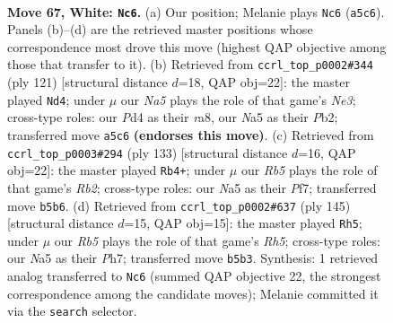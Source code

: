 \documentclass[11pt]{article}
\begin{document}
\clearpage

\begin{figure}[p]\centering
\begin{subfigure}{0.46\textwidth}\centering
\resizebox{\linewidth}{!}{%
\newchessgame
\chessboard[
  setfen={8/6p1/5p1k/NR5p/3P3P/6PK/r7/8 w - - 27 67},
  showmover=false,
  pgfstyle=straightmove, color=movearrow, markmove={a5-c6}
]}
\caption{}
\end{subfigure}\hfill
\begin{subfigure}{0.46\textwidth}\centering
\resizebox{\linewidth}{!}{%
\newchessgame
\chessboard[
  setfen={R7/8/1R2n1p1/5k1p/7P/6PK/1pr5/8 b - - 9 61},
  showmover=false,
  pgfstyle=straightmove, color=movearrow, markmove={e6-d4}
]}
\caption{}
\end{subfigure}
\\[4pt]
\begin{subfigure}{0.46\textwidth}\centering
\resizebox{\linewidth}{!}{%
\newchessgame
\chessboard[
  setfen={5R2/1r3p2/4pPk1/4P2p/5K2/6P1/8/8 b - - 13 67},
  showmover=false,
  pgfstyle=straightmove, color=movearrow, markmove={b7-b4}
]}
\caption{}
\end{subfigure}\hfill
\begin{subfigure}{0.46\textwidth}\centering
\resizebox{\linewidth}{!}{%
\newchessgame
\chessboard[
  setfen={8/5R1p/1pk3p1/6P1/P6r/KP6/8/8 b - - 2 73},
  showmover=false,
  pgfstyle=straightmove, color=movearrow, markmove={h4-h5}
]}
\caption{}
\end{subfigure}
\caption{\textbf{Move 67, White: \texttt{Nc6}.} (a) Our position; Melanie plays \texttt{Nc6} (\texttt{a5c6}). Panels (b)--(d) are the retrieved master positions whose correspondence most drove this move (highest QAP objective among those that transfer to it). (b) Retrieved from \texttt{ccrl\_top\_p0002\#344} (ply 121) [structural distance $d$=18, QAP obj=22]: the master played \texttt{Nd4}; under $\mu$ our \emph{Na5} plays the role of that game's \emph{Ne3}; cross-type roles: our \emph{P}d4 as their \emph{r}a8, our \emph{N}a5 as their \emph{P}b2; transferred move \texttt{a5c6} \textbf{(endorses this move)}. (c) Retrieved from \texttt{ccrl\_top\_p0003\#294} (ply 133) [structural distance $d$=16, QAP obj=22]: the master played \texttt{Rb4+}; under $\mu$ our \emph{Rb5} plays the role of that game's \emph{Rb2}; cross-type roles: our \emph{N}a5 as their \emph{P}f7; transferred move \texttt{b5b6}. (d) Retrieved from \texttt{ccrl\_top\_p0002\#637} (ply 145) [structural distance $d$=15, QAP obj=15]: the master played \texttt{Rh5}; under $\mu$ our \emph{Rb5} plays the role of that game's \emph{Rh5}; cross-type roles: our \emph{N}a5 as their \emph{P}h7; transferred move \texttt{b5b3}. Synthesis: 1 retrieved analog transferred to \texttt{Nc6} (summed QAP objective 22, the strongest correspondence among the candidate moves); Melanie committed it via the \texttt{search} selector.}
\label{fig:thought-m132}
\end{figure}
\end{document}

